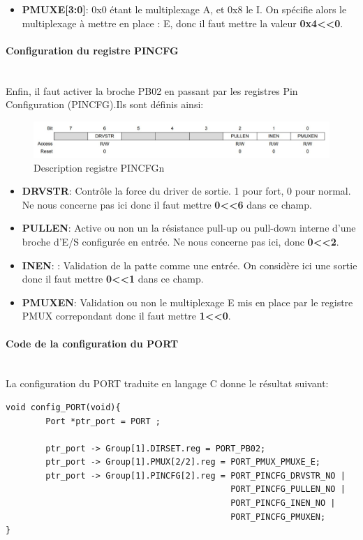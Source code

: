 \documentclass[a4paper]{article}
\begin{document}
	\begin{itemize}
		\item {\bf PMUXE[3:0]}: 0x0 étant le multiplexage A, et 0x8 le I. On spécifie alors le multiplexage à mettre en place : E, donc il faut mettre la valeur {\bf 0x4\textless\textless0}.
	\end{itemize}
	\newpage
	\paragraph{Configuration du registre PINCFG} 
	~~\\
	Enfin, il faut activer la broche PB02 en passant par les registres Pin Configuration (PINCFG).Ils sont définis ainsi:   
	\begin{figure}[H]
		\centering
		\includegraphics[width=0.9\linewidth]{PINCFGn.jpg}
		\caption{Description registre PINCFGn}
	\end{figure}
	
	\begin{itemize}
		\item {\bf DRVSTR}: Contrôle la force du driver de sortie. 1 pour fort, 0 pour normal. Ne nous concerne pas ici donc il faut mettre {\bf 0\textless\textless6} dans ce champ.~~\\
		\item {\bf PULLEN}: Active ou non un la résistance pull-up ou pull-down interne d'une broche d'E/S configurée en entrée. Ne nous concerne pas ici, donc {\bf 0\textless\textless2}.~~\\
		\item {\bf INEN}: : Validation de la patte comme une entrée. On considère ici une sortie donc il faut mettre {\bf 0\textless\textless1} dans ce champ.~~\\
		\item {\bf PMUXEN}: Validation ou non le multiplexage E mis en place par le registre PMUX correpondant donc il faut mettre {\bf 1\textless\textless0}.~~\\
	\end{itemize}

	
	\paragraph{Code de la configuration du PORT} ~~\\
	La configuration du PORT traduite en langage C donne le résultat suivant:
	\begin{lstlisting}[style=CStyle]
void config_PORT(void){
	    Port *ptr_port = PORT ;
	
	    ptr_port -> Group[1].DIRSET.reg = PORT_PB02; 
	    ptr_port -> Group[1].PMUX[2/2].reg = PORT_PMUX_PMUXE_E;
	    ptr_port -> Group[1].PINCFG[2].reg = PORT_PINCFG_DRVSTR_NO |
	                                         PORT_PINCFG_PULLEN_NO |
	                                         PORT_PINCFG_INEN_NO |
	                                         PORT_PINCFG_PMUXEN;
}
	\end{lstlisting}
	
\end{document}
